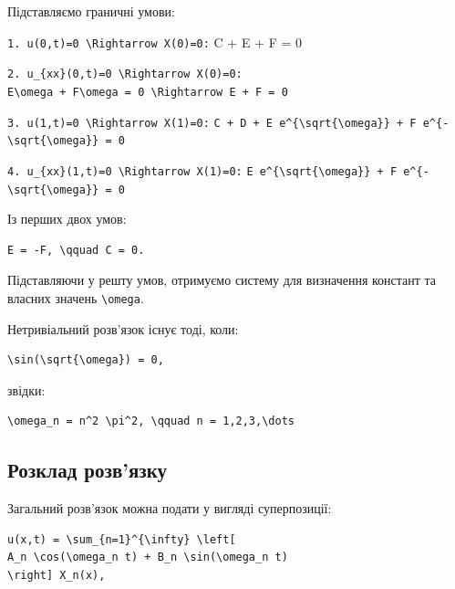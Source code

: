 \documentclass[
  ukrainian,
]{article}
\begin{document}
Підставляємо граничні умови:

\texttt{1.\ \textquotesingle{}u(0,t)=0\ \textbackslash{}Rightarrow\ X(0)=0\textquotesingle{}:}
C + E + F = 0

\texttt{2.\ \textquotesingle{}u\_\{xx\}(0,t)=0\ \textbackslash{}Rightarrow\ X\textquotesingle{}\textquotesingle{}(0)=0\textquotesingle{}:}
\texttt{E\textbackslash{}omega\ +\ F\textbackslash{}omega\ =\ 0\ \textbackslash{}Rightarrow\ E\ +\ F\ =\ 0}

\texttt{3.\ \textquotesingle{}u(1,t)=0\ \textbackslash{}Rightarrow\ X(1)=0\textquotesingle{}:}
\texttt{C\ +\ D\ +\ E\ e\^{}\{\textbackslash{}sqrt\{\textbackslash{}omega\}\}\ +\ F\ e\^{}\{-\textbackslash{}sqrt\{\textbackslash{}omega\}\}\ =\ 0}

\texttt{4.\ \textquotesingle{}u\_\{xx\}(1,t)=0\ \textbackslash{}Rightarrow\ X\textquotesingle{}\textquotesingle{}(1)=0\textquotesingle{}:}
\texttt{E\ e\^{}\{\textbackslash{}sqrt\{\textbackslash{}omega\}\}\ +\ F\ e\^{}\{-\textbackslash{}sqrt\{\textbackslash{}omega\}\}\ =\ 0}

Із перших двох умов:

\begin{verbatim}
E = -F, \qquad C = 0.
\end{verbatim}

Підставляючи у решту умов, отримуємо систему для визначення констант та
власних значень \texttt{\textbackslash{}omega}.

Нетривіальний розв'язок існує тоді, коли:

\begin{verbatim}
\sin(\sqrt{\omega}) = 0,
\end{verbatim}

звідки:

\begin{verbatim}
\omega_n = n^2 \pi^2, \qquad n = 1,2,3,\dots
\end{verbatim}

\subsection{Розклад
розв'язку}\label{ux440ux43eux437ux43aux43bux430ux434-ux440ux43eux437ux432ux44fux437ux43aux443}

Загальний розв'язок можна подати у вигляді суперпозиції:

\begin{verbatim}
u(x,t) = \sum_{n=1}^{\infty} \left[
A_n \cos(\omega_n t) + B_n \sin(\omega_n t)
\right] X_n(x),
\end{verbatim}
\end{document}
